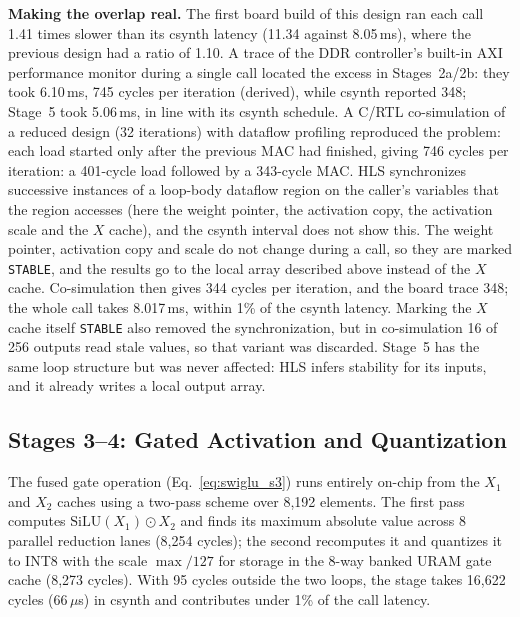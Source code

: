 \textbf{Making the overlap real.} The first board build of this design ran each call
1.41 times slower than its csynth latency (11.34 against 8.05\,ms), where the previous
design had a ratio of 1.10. A trace of the DDR controller's built-in AXI performance
monitor during a single call located the excess in Stages~2a/2b: they took 6.10\,ms,
745 cycles per iteration (derived), while csynth reported 348; Stage~5 took 5.06\,ms,
in line with its csynth schedule. A C/RTL co-simulation of a reduced design (32
iterations) with dataflow profiling reproduced the problem: each load started only after
the previous MAC had finished, giving 746 cycles per iteration: a 401-cycle load
followed by a 343-cycle MAC. HLS synchronizes successive instances of a loop-body dataflow
region on the caller's variables that the region accesses (here the weight pointer, the
activation copy, the activation scale and the $X$ cache), and the csynth interval does
not show this. The weight pointer, activation copy and scale do not change during a
call, so they are marked \texttt{STABLE}, and the results go to the local array
described above instead of the $X$ cache. Co-simulation then gives 344 cycles per
iteration, and the board trace 348; the whole call takes 8.017\,ms, within 1\% of the
csynth latency. Marking the $X$ cache itself \texttt{STABLE} also removed the
synchronization, but in co-simulation 16 of 256 outputs read stale values, so that
variant was discarded. Stage~5 has the same loop structure but was never affected: HLS
infers stability for its inputs, and it already writes a local output array.

\subsection{Stages 3--4: Gated Activation and Quantization}
The fused gate operation (Eq.~\eqref{eq:swiglu_s3}) runs entirely on-chip from the
$X_1$ and $X_2$ caches using a two-pass scheme over 8,192 elements. The first pass
computes $\text{SiLU}(X_1)\odot X_2$ and finds its maximum absolute value across 8
parallel reduction lanes (8,254 cycles); the second recomputes it and quantizes it to
INT8 with the scale $\max/127$ for storage in the 8-way banked URAM gate cache (8,273
cycles). With 95 cycles outside the two loops, the stage takes 16,622 cycles
(66\,$\mu$s) in csynth and contributes under 1\% of the call
latency.

